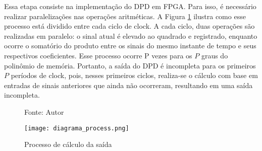 Essa etapa consiste na implementação do DPD em FPGA. Para isso, é necessário realizar paralelizações nas operações aritméticas. A Figura \ref{fig:diagramaprocess} ilustra como esse processo está dividido entre cada ciclo de clock. A cada ciclo, duas operações são realizadas em paralelo: o sinal atual é elevado ao quadrado e registrado, enquanto ocorre o somatório do produto entre os sinais do mesmo instante de tempo e seus respectivos coeficientes. Esse processo ocorre P vezes para os \( P \) graus do polinômio de memória. Portanto, a saída do DPD é incompleta para os primeiros \( P \) períodos de clock, pois, nesses primeiros ciclos, realiza-se o cálculo com base em entradas de sinais anteriores que ainda não ocorreram, resultando em uma saída incompleta.

\begin{figure}[ht!]
	\centering
	\captionsetup{justification=centering}
	\caption*{Fonte: Autor}
	\texttt{[image: diagrama\_process.png]}
	\caption{Processo de cálculo da saída}
	\label{fig:diagramaprocess}
\end{figure}